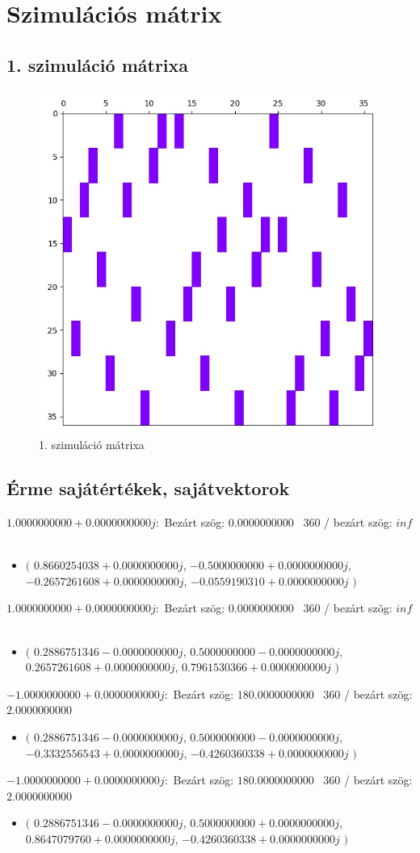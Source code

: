 \documentclass[14pt,a4paper]{article}
\begin{document}
\section{Szimulációs mátrix}
\subsection{1. szimuláció mátrixa}
\begin{figure}[H]
\centering
\includegraphics[width = 0.7\columnwidth]{sim_01/simulation_matrix.jpg}
\caption{1. szimuláció mátrixa}
\end{figure}
\subsection{Érme sajátértékek, sajátvektorok}
$1.0000000000+0.0000000000j$:\
Bezárt szög: $0.0000000000$ \
360 / bezárt szög: $inf$\
\begin{itemize}
\item
$\big($
$0.8660254038+0.0000000000j$, $-0.5000000000+0.0000000000j$, $-0.2657261608+0.0000000000j$, $-0.0559190310+0.0000000000j$
$\big)$
\end{itemize}
$1.0000000000+0.0000000000j$:\
Bezárt szög: $0.0000000000$ \
360 / bezárt szög: $inf$\
\begin{itemize}
\item
$\big($
$0.2886751346-0.0000000000j$, $0.5000000000-0.0000000000j$, $0.2657261608+0.0000000000j$, $0.7961530366+0.0000000000j$
$\big)$
\end{itemize}
$-1.0000000000+0.0000000000j$:\
Bezárt szög: $180.0000000000$ \
360 / bezárt szög: $2.0000000000$\
\begin{itemize}
\item
$\big($
$0.2886751346-0.0000000000j$, $0.5000000000-0.0000000000j$, $-0.3332556543+0.0000000000j$, $-0.4260360338+0.0000000000j$
$\big)$
\end{itemize}
$-1.0000000000+0.0000000000j$:\
Bezárt szög: $180.0000000000$ \
360 / bezárt szög: $2.0000000000$\
\begin{itemize}
\item
$\big($
$0.2886751346-0.0000000000j$, $0.5000000000+0.0000000000j$, $0.8647079760+0.0000000000j$, $-0.4260360338+0.0000000000j$
$\big)$
\end{itemize}
\end{document}
